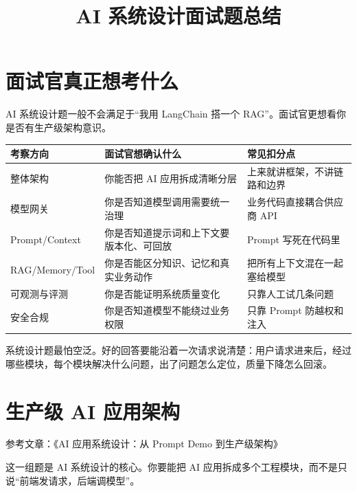 \documentclass[9pt,a4paper,twocolumn]{ctexart}
\begin{document}
\title{AI 系统设计面试题总结}
\date{}
\maketitle
{}

\section*{面试官真正想考什么}


AI 系统设计题一般不会满足于“我用 LangChain 搭一个 RAG”。面试官更想看你是否有生产级架构意识。


{\footnotesize
\begin{tabular}{|p{}|p{}|p{}|}
\hline
\textbf{考察方向} & \textbf{面试官想确认什么} & \textbf{常见扣分点} \\
\hline
整体架构 & 你能否把 AI 应用拆成清晰分层 & 上来就讲框架，不讲链路和边界 \\
\hline
模型网关 & 你是否知道模型调用需要统一治理 & 业务代码直接耦合供应商 API \\
\hline
Prompt/Context & 你是否知道提示词和上下文要版本化、可回放 & Prompt 写死在代码里 \\
\hline
RAG/Memory/Tool & 你是否能区分知识、记忆和真实业务动作 & 把所有上下文混在一起塞给模型 \\
\hline
可观测与评测 & 你是否能证明系统质量变化 & 只靠人工试几条问题 \\
\hline
安全合规 & 你是否知道模型不能绕过业务权限 & 只靠 Prompt 防越权和注入 \\
\hline
\end{tabular}
}



系统设计题最怕空泛。好的回答要能沿着一次请求说清楚：用户请求进来后，经过哪些模块，每个模块解决什么问题，出了问题怎么定位，质量下降怎么回滚。



\section*{生产级 AI 应用架构}


参考文章：《AI 应用系统设计：从 Prompt Demo 到生产级架构》



这一组题是 AI 系统设计的核心。你要能把 AI 应用拆成多个工程模块，而不是只说“前端发请求，后端调模型”。
\end{document}

